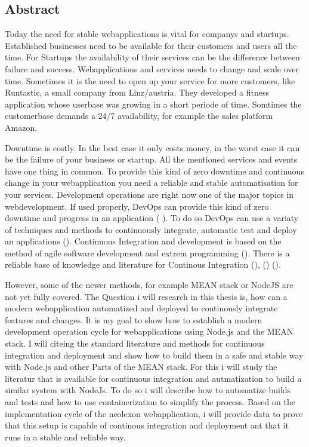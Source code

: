 \subsection*{Abstract}

Today the need for stable webapplications is vital for companys and startups. Established businesses need to be
available for their customers and users all the time. For Startups the availability of their services can be the difference
between failure and success. Webapplications and services needs to change and scale over time. Sometimes it is the need
to open up your service for more customers, like Runtastic, a small company from Linz/austria. They developed
a fitness application whose userbase was growing in a short periode of time. Somtimes the customerbase demands a 24/7
availability, for example the sales platform Amazon.

Downtime is costly. In the best case it only costs money, in the worst case
it can be the failure of your business or startup. All the mentioned services and events have one thing in common. To provide this kind of zero downtime and continuous change in
your webapplication you need a reliable and stable automatisation for your services. Development operations are right now one of
the major topics in webdevelopment. If used properly, DevOps can provide this kind of zero downtime and progress in an application
(\cite{humble2010continuous} \cite{duvall2007continuous}). To do so DevOps can use a variaty of techniques and methods to continuously
integrate, automatic test and deploy an applications (\cite{meyer2014continuous}).
Continuous Integration and development is based on the method of agile software development and extrem programming
(\cite{lindstrom2004extreme}). There is a reliable base of knowledge and literature for Continous Integration
(\cite{schaefer2013continuous}), (\cite{fowler2006continuous}) (\cite{fowler2012continuous}).

However, some of the newer methods, for example
MEAN stack or NodeJS are not yet fully covered.
The Question i will research in this thesis is, how can a modern webapplication automatized and deployed to continously integrate features and
changes. It is my goal to show how to establish a modern development operation cycle for webapplications using Node.js and the MEAN stack.
I will citeing the standard literature and methods for continuous integration and deployment and show how to build them in a safe and stable
way with Node.js and other Parts of the MEAN stack.
For this i will study the literatur that is available for continuous integration and autmatization to build a similar system with NodeJs.
To do so i will describe how to automatize builds and tests and how to use containerization to simplify the process. Based on the
implementation cycle of the neolexon webapplication, i will provide data to prove that this setup is capable of continous integration and deployment
ant that it runs in a stable and reliable way.

